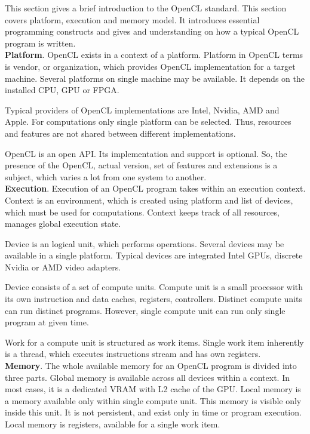 This section gives a brief introduction to the OpenCL standard. This section covers platform, execution and memory model. It introduces essential programming constructs and gives and understanding on how a typical OpenCL program is written.\\

\textbf{Platform}. OpenCL exists in a context of a platform. Platform in OpenCL terms is vendor, or organization, which provides OpenCL implementation for a target machine. Several platforms on single machine may be available. It depends on the installed CPU, GPU or FPGA. 

Typical providers of OpenCL implementations are Intel, Nvidia, AMD and Apple. For computations only single platform can be selected. Thus, resources and features are not shared between different implementations.

OpenCL is an open API. Its implementation and support is optional. So, the presence of the OpenCL, actual version, set of features and extensions is a subject, which varies a lot from one system to another.\\

\textbf{Execution}. Execution of an OpenCL program takes within an execution context. Context is an environment, which is created using platform and list of devices, which must be used for computations. Context keeps track of all resources, manages global execution state.

Device is an logical unit, which performs operations. Several devices may be available in a single platform. Typical devices are integrated Intel GPUs, discrete Nvidia or AMD video adapters.

Device consists of a set of compute units. Compute unit is a small processor with its own instruction and data caches, registers, controllers. Distinct compute units can run distinct programs. However, single compute unit can run only single program at given time.

Work for a compute unit is structured as work items. Single work item inherently is a thread, which executes instructions stream and has own registers.\\

\textbf{Memory}. The whole available memory for an OpenCL program is divided into three parts. Global memory is available across all devices within a context. In most cases, it is a dedicated VRAM with L2 cache of the GPU. Local memory is a memory available only within single compute unit. This memory is visible only inside this unit. It is not persistent, and exist only in time or program execution. Local memory is registers, available for a single work item.\\

